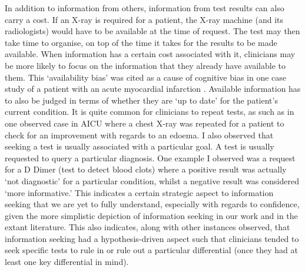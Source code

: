 \documentclass[a4paper, nobind]{templates/ociamthesis}
\begin{document}
\hfill\break
In addition to information from others, information from test results can also carry a cost. If an X-ray is required for a patient, the X-ray machine (and its radiologists) would have to be available at the time of request. The test may then take time to organise, on top of the time it takes for the results to be made available. When information has a certain cost associated with it, clinicians may be more likely to focus on the information that they already have available to them. This `availability bias' was cited as a cause of cognitive bias in one case study of a patient with an acute myocardial infarction \autocite{schlogl_foreign_2018}. Available information has to also be judged in terms of whether they are `up to date' for the patient's current condition. It is quite common for clinicians to repeat tests, as such as in one observed case in AICU where a chest X-ray was repeated for a patient to check for an improvement with regards to an edoema. I also observed that seeking a test is usually associated with a particular goal. A test is usually requested to query a particular diagnosis. One example I observed was a request for a D Dimer (test to detect blood clots) where a positive result was actually `not diagnostic' for a particular condition, whilst a negative result was considered `more informative.' This indicates a certain strategic aspect to information seeking that we are yet to fully understand, especially with regards to confidence, given the more simplistic depiction of information seeking in our work and in the extant literature. This also indicates, along with other instances observed, that information seeking had a hypothesis-driven aspect such that clinicians tended to seek specific tests to rule in or rule out a particular differential (once they had at least one key differential in mind).
\end{document}
